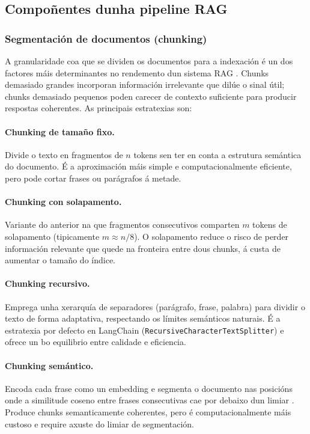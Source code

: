 \documentclass[11pt, a4paper, oneside]{report}
\begin{document}
\subsection{Compoñentes dunha pipeline RAG}
\label{sec:componentes}

\subsubsection{Segmentación de documentos (chunking)}
\label{sec:chunking_teoria}

A granularidade coa que se dividen os documentos para a indexación é un dos factores
máis determinantes no rendemento dun sistema RAG \citep{shi2024chunking}. Chunks
demasiado grandes incorporan información irrelevante que dilúe o sinal útil; chunks
demasiado pequenos poden carecer de contexto suficiente para producir respostas
coherentes. As principais estratexias son:

\paragraph{Chunking de tamaño fixo.} Divide o texto en fragmentos de $n$ tokens
sen ter en conta a estrutura semántica do documento. É a aproximación máis simple e
computacionalmente eficiente, pero pode cortar frases ou parágrafos á metade.

\paragraph{Chunking con solapamento.} Variante do anterior na que fragmentos consecutivos
comparten $m$ tokens de solapamento (tipicamente $m \approx n/8$). O solapamento reduce
o risco de perder información relevante que quede na fronteira entre dous chunks, á custa
de aumentar o tamaño do índice.

\paragraph{Chunking recursivo.} Emprega unha xerarquía de separadores (parágrafo, frase,
palabra) para dividir o texto de forma adaptativa, respectando os límites semánticos
naturais. É a estratexia por defecto en LangChain
(\texttt{RecursiveCharacterTextSplitter}) e ofrece un bo equilibrio entre calidade e
eficiencia.

\paragraph{Chunking semántico.} Encoda cada frase como un embedding e segmenta o
documento nas posicións onde a similitude coseno entre frases consecutivas cae por
debaixo dun limiar \citep{kamradt2023semantic}. Produce chunks semanticamente
coherentes, pero é computacionalmente máis custoso e require axuste do limiar de
segmentación.
\end{document}

